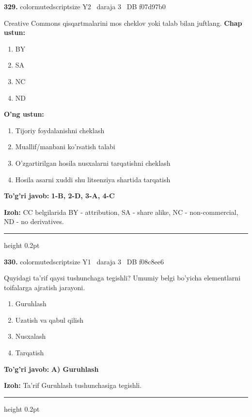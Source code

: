 \documentclass[10pt,a4paper,oneside]{article}
\begin{document}
\noindent\textbf{\color{ink}329.}  {color{muted}scriptsize Y2 \textbullet\ daraja 3 \textbullet\ DB f07d97b0}
\par
Creative Commons qisqartmalarini mos cheklov yoki talab bilan juftlang.
\textbf{\footnotesize Chap ustun:}
\begin{enumerate}[label=\arabic*),leftmargin=9mm]
\item BY
\item SA
\item NC
\item ND
\end{enumerate}
\textbf{\footnotesize O'ng ustun:}
\begin{enumerate}[label=\Alph*),leftmargin=9mm]
\item Tijoriy foydalanishni cheklash
\item Muallif/manbani ko'rsatish talabi
\item O'zgartirilgan hosila nusxalarni tarqatishni cheklash
\item Hosila asarni xuddi shu litsenziya shartida tarqatish
\end{enumerate}
\begin{tcolorbox}[enhanced,breakable,colback=teal!4,colframe=teal!50!black,boxrule=0.5pt,arc=1.1mm,left=3mm,right=3mm,top=1.7mm,bottom=1.7mm,before skip=2mm,after skip=2mm]
\textbf{\color{teal}To'g'ri javob:} \textbf{1-B, 2-D, 3-A, 4-C}
\par\smallskip
\textbf{Izoh:} CC belgilarida BY - attribution, SA - share alike, NC - non-commercial, ND - no derivatives.
\end{tcolorbox}
\vspace{2mm}\hrule height 0.2pt \vspace{3mm}

\noindent\textbf{\color{ink}330.}  {color{muted}scriptsize Y1 \textbullet\ daraja 3 \textbullet\ DB f08c8ee6}
\par
Quyidagi ta'rif qaysi tushunchaga tegishli? Umumiy belgi bo'yicha elementlarni toifalarga ajratish jarayoni.
\begin{enumerate}[label=\Alph*),leftmargin=9mm]
\item Guruhlash
\item Uzatish va qabul qilish
\item Nusxalash
\item Tarqatish
\end{enumerate}
\begin{tcolorbox}[enhanced,breakable,colback=teal!4,colframe=teal!50!black,boxrule=0.5pt,arc=1.1mm,left=3mm,right=3mm,top=1.7mm,bottom=1.7mm,before skip=2mm,after skip=2mm]
\textbf{\color{teal}To'g'ri javob:} \textbf{A) Guruhlash}
\par\smallskip
\textbf{Izoh:} Ta'rif Guruhlash tushunchasiga tegishli.
\end{tcolorbox}
\vspace{2mm}\hrule height 0.2pt \vspace{3mm}
\end{document}
